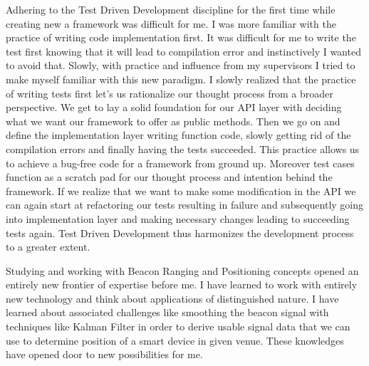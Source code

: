 \par Adhering to the Test Driven Development discipline for the first time while creating new a framework was difficult for me. I was more familiar with the practice of  writing code implementation first. It was difficult for me to write the test first knowing that it will lead to compilation error and instinctively I wanted to avoid that. Slowly, with practice and influence from my supervisors I tried to make myself familiar with this new paradigm. I slowly realized that the practice of writing tests first let's us rationalize our thought process from a broader perspective. We get to lay a solid foundation for our API layer with deciding what we want our framework to offer as public methods. Then we go on and define the implementation layer writing function code, slowly getting rid of the compilation errors and finally having the tests succeeded. This practice allows us to achieve a bug-free code for a framework from ground up. Moreover test cases function as a scratch pad for our thought process and intention behind the framework. If we realize that we want to make some modification in the API we can again start at refactoring our tests resulting in failure and subsequently going into implementation layer and making necessary changes leading to succeeding tests again. Test Driven Development thus harmonizes the development process to a greater extent.

\par Studying and working with Beacon Ranging and Positioning concepts opened an entirely new frontier of expertise before me. I have learned to work with entirely new technology and think about applications of distinguished nature. I have learned about associated challenges like smoothing the beacon signal with techniques like Kalman Filter in order to derive usable signal data that we can use to determine position of a smart device in given venue. These knowledges have opened door to new possibilities for me.
